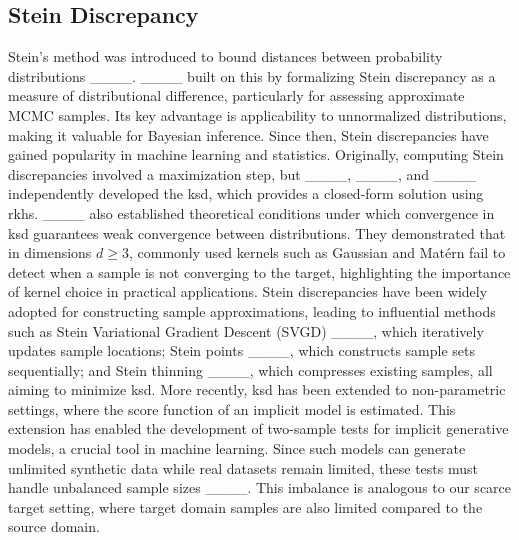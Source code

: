 \subsection{Stein Discrepancy}

Stein's method was introduced to bound distances between probability distributions ____. ____ built on this by formalizing Stein discrepancy as a measure of distributional difference, particularly for assessing approximate MCMC samples. Its key advantage is applicability to unnormalized distributions, making it valuable for Bayesian inference. Since then, Stein discrepancies have gained popularity in machine learning and statistics. 
Originally, computing Stein discrepancies involved a maximization step, 
but
____, ____, and ____ 
independently developed the \ac{ksd}, which provides a closed-form solution using \ac{rkhs}. ____ also established theoretical conditions under which convergence in \ac{ksd} guarantees weak convergence between distributions.
They demonstrated that in dimensions $d \geq 3$, commonly used kernels such as Gaussian and Matérn fail to detect when a sample is not converging to the target, highlighting the importance of kernel choice in practical applications. 
Stein discrepancies have been widely adopted for constructing sample approximations, leading to influential methods such as Stein Variational Gradient Descent (SVGD) ____, which iteratively updates sample locations; Stein points ____, which constructs sample sets sequentially; and Stein thinning ____, which compresses existing samples, all aiming to minimize \ac{ksd}. 
More recently, \ac{ksd} has been extended to non-parametric settings, where the score function of an implicit model is estimated. This extension has enabled the development of two-sample tests for implicit generative models, a crucial tool in machine learning. Since such models can generate unlimited synthetic data while real datasets remain limited, these tests must handle unbalanced sample sizes ____. This imbalance is analogous to our scarce target setting, where target domain samples are also limited compared to the source domain.